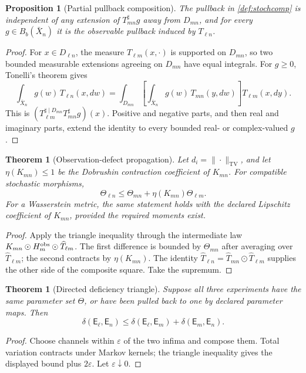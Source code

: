 \documentclass[11pt,a4paper]{article}
\theoremstyle{definition}
\theoremstyle{plain}
\newtheorem{proposition}[definition]{Proposition}
\newtheorem{theorem}[definition]{Theorem}
\theoremstyle{remark}
\newcommand{\TV}{\mathrm{TV}}
\begin{document}
\begin{proposition}[Partial pullback composition]\label{prop:partialpullback}
The pullback in \cref{def:stochcomp} is independent of any extension of
\(T_{mn}^{\sharp}g\) away from \(D_{mn}\), and for every
\(g\in B_b(\bar X_n)\) it is the observable pullback induced by
\(T_{\ell n}\).
\end{proposition}
\begin{proof}
For \(x\in D_{\ell n}\), the measure \(T_{\ell m}(x,\cdot)\) is supported on
\(D_{mn}\), so two bounded measurable extensions agreeing on \(D_{mn}\) have
equal integrals.  For \(g\ge0\), Tonelli's theorem gives
\[
\int_{\bar X_n}g(w)\,T_{\ell n}(x,dw)
=\int_{D_{mn}}\!\left[
\int_{\bar X_n}g(w)\,T_{mn}(y,dw)\right]T_{\ell m}(x,dy).
\]
This is
\((T_{\ell m}^{\sharp\mid D_{mn}}T_{mn}^{\sharp}g)(x)\).
Positive and negative parts, and then real and imaginary parts, extend the
identity to every bounded real- or complex-valued \(g\).
\end{proof}

\begin{theorem}[Observation-defect propagation]\label{thm:theta}
Let \(d_i=\|\cdot\|_{\TV}\), and let
\(\eta(K_{mn})\le1\) be the Dobrushin contraction coefficient of
\(K_{mn}\).  For compatible stochastic morphisms,
\[
\Theta_{\ell n}
\le \Theta_{mn}+\eta(K_{mn})\Theta_{\ell m}.
\]
For a Wasserstein metric, the same statement holds with the declared
Lipschitz coefficient of \(K_{mn}\), provided the required moments exist.
\end{theorem}
\begin{proof}
Apply the triangle inequality through the intermediate law
\(K_{mn}\odot H_m^{\rm obs}\odot\widehat T_{\ell m}\).  The first difference
is bounded by \(\Theta_{mn}\) after averaging over
\(\widehat T_{\ell m}\); the second contracts by \(\eta(K_{mn})\).  The
identity \(\widehat T_{\ell n}
=\widehat T_{mn}\odot\widehat T_{\ell m}\) supplies the other side of the
composite square.  Take the supremum.
\end{proof}

\begin{theorem}[Directed deficiency triangle]\label{thm:deftriangle}
Suppose all three experiments have the same parameter set \(\Theta\), or have
been pulled back to one by declared parameter maps.  Then
\[
\delta(\mathsf E_\ell,\mathsf E_n)
\le\delta(\mathsf E_\ell,\mathsf E_m)
  +\delta(\mathsf E_m,\mathsf E_n).
\]
\end{theorem}
\begin{proof}
Choose channels within \(\varepsilon\) of the two infima and compose them.
Total variation contracts under Markov kernels; the triangle inequality gives
the displayed bound plus \(2\varepsilon\).  Let \(\varepsilon\downarrow0\).
\end{proof}
\end{document}
